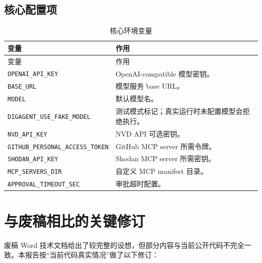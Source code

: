 \documentclass[UTF8,zihao=-4,a4paper,fontset=none]{ctexart}
\newcommand{\code}[1]{\texttt{\footnotesize #1}}
\begin{document}
\subsection{核心配置项}

\begin{longtable}{L{0.40\textwidth}L{0.46\textwidth}}
\caption{核心环境变量}\label{tab:env}\\
\toprule
变量 & 作用 \\
\midrule
\endfirsthead
\toprule
变量 & 作用 \\
\midrule
\endhead
\code{OPENAI\_API\_KEY} & OpenAI-compatible 模型密钥。 \\
\code{BASE\_URL} & 模型服务 base URL。 \\
\code{MODEL} & 默认模型名。 \\
\code{DIGAGENT\_USE\_FAKE\_MODEL} & 测试模式标记；真实运行时未配置模型会拒绝执行。 \\
\code{NVD\_API\_KEY} & NVD API 可选密钥。 \\
\code{GITHUB\_PERSONAL\_ACCESS\_TOKEN} & GitHub MCP server 所需令牌。 \\
\code{SHODAN\_API\_KEY} & Shodan MCP server 所需密钥。 \\
\code{MCP\_SERVERS\_DIR} & 自定义 MCP manifest 目录。 \\
\code{APPROVAL\_TIMEOUT\_SEC} & 审批超时配置。 \\
\bottomrule
\end{longtable}

\section{与废稿相比的关键修订}

废稿 Word 技术文档给出了较完整的设想，但部分内容与当前公开代码不完全一致。本报告按“当前代码真实情况”做了以下修订：
\end{document}
